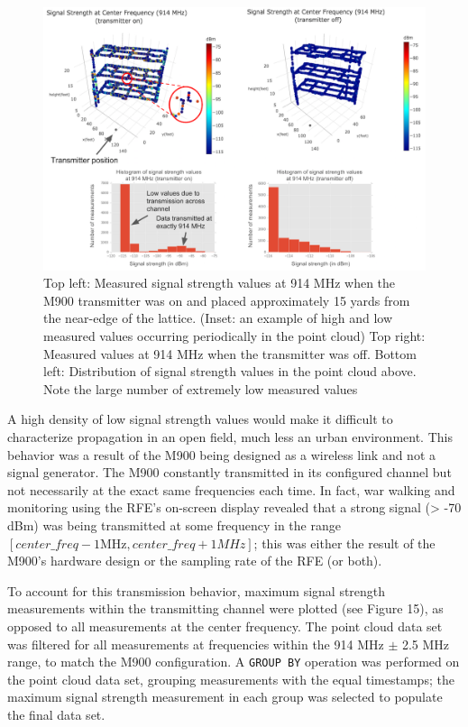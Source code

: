 \documentclass[pageno]{jpaper}
\begin{document}
\begin{figure}
	\caption[Point cloud visualization of 900 MHz open field test]{Top left: Measured signal strength values at 914 MHz when the M900 transmitter was on and placed approximately 15 yards from the near-edge of the lattice. (Inset: an example of high and low measured values occurring periodically in the point cloud) Top right: Measured values at 914 MHz when the transmitter was off. Bottom left: Distribution of signal strength values in the point cloud above. Note the large number of extremely low measured values }
	\centerline{\includegraphics{Sexton_1}}
\end{figure}

A high density of low signal strength values would make it difficult to characterize propagation in an open field, much less an urban environment. This behavior was a result of the M900 being designed as a wireless link and not a signal generator. The M900 constantly transmitted in its configured channel but not necessarily at the exact same frequencies each time. In fact, war walking and monitoring using the RFE's on-screen display revealed that a strong signal (> -70 dBm) was being transmitted at some frequency in the range $[center\_freq - 1 \text{MHz}, center\_freq + 1 MHz]$; this was either the result of the M900's hardware design or the sampling rate of the RFE (or both). 

To account for this transmission behavior, maximum signal strength measurements within the transmitting channel were plotted (see Figure 15), as opposed to all measurements at the center frequency. The point cloud data set was filtered for all measurements at frequencies within the 914 MHz $\pm$ 2.5 MHz range, to match the M900 configuration.  A \texttt{GROUP BY} operation was performed on the point cloud data set, grouping measurements with the equal timestamps; the maximum signal strength measurement in each group was selected to populate the final data set. 
\end{document}
